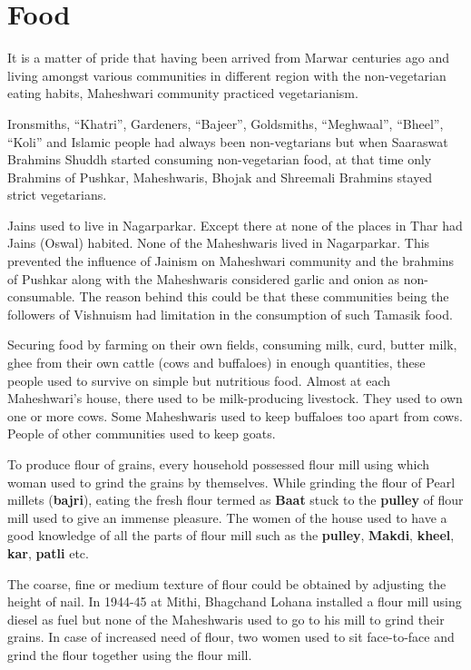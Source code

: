 \section{Food}
It is a matter of pride that having been arrived from Marwar centuries ago and
living amongst various communities in different region with the non-vegetarian
eating habits, Maheshwari community practiced vegetarianism.

Ironsmiths, ``Khatri'', Gardeners, ``Bajeer'', Goldsmiths, ``Meghwaal'',
``Bheel'', ``Koli'' and Islamic people had always been non-vegtarians but when
Saaraswat Brahmins Shuddh started consuming non-vegetarian food, at that time
only Brahmins of Pushkar, Maheshwaris, Bhojak and Shreemali Brahmins stayed
strict vegetarians.

Jains used to live in Nagarparkar. Except there at none of the places in Thar
had Jains (Oswal) habited. None of the Maheshwaris lived in Nagarparkar. This
prevented the influence of Jainism on Maheshwari community and the brahmins of
Pushkar along with the Maheshwaris considered garlic and onion as
non-consumable. The reason behind this could be that these communities being the
followers of Vishnuism had limitation in the consumption of such Tamasik food.

Securing food by farming on their own fields, consuming milk, curd, butter milk,
ghee from their own cattle (cows and buffaloes) in enough quantities, these
people used to survive on simple but nutritious food. Almost at each
Maheshwari's house, there used to be milk-producing livestock. They used to own
one or more cows. Some Maheshwaris used to keep buffaloes too apart from cows.
People of other communities used to keep goats.

To produce flour of grains, every household possessed flour mill using which
woman used to grind the grains by themselves. While grinding the flour of Pearl
millets (\textbf{bajri}), eating the fresh flour termed as \textbf{Baat} stuck
to the \textbf{pulley} of flour mill used to give an immense pleasure. The women
of the house used to have a good knowledge of all the parts of flour mill such
as the \textbf{pulley}, \textbf{Makdi}, \textbf{kheel}, \textbf{kar},
\textbf{patli} etc.

The coarse, fine or medium texture of flour could be obtained by adjusting the
height of nail. In 1944-45 at Mithi, Bhagchand Lohana installed a flour mill
using diesel as fuel but none of the Maheshwaris used to go to his mill to grind
their grains. In case of increased need of flour, two women used to sit
face-to-face and grind the flour together using the flour mill.


